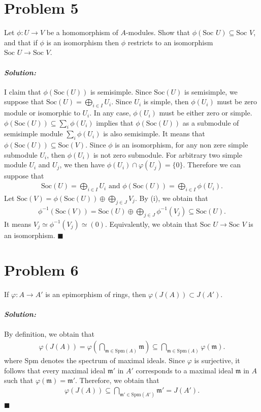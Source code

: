 \documentclass[12pt, a4paper]{article}
\theoremstyle{remark}
\newenvironment{solution}
  {\paragraph{\textit{Solution:}}\par\medskip}
  {\hfill$\blacksquare$\vspace{0.1cm}}
\begin{document}
\section*{Problem 5}
Let $\phi : U \to V$ be a homomorphism of $A$-modules. Show that $\phi(\text{Soc } U) \subseteq \text{Soc } V$, and that if $\phi$ is an isomorphism then $\phi$ restricts to an isomorphism $\text{Soc } U \to \text{Soc } V$.
\begin{solution}
    I claim that $\phi(\text{Soc}(U))$ is semisimple. Since $\text{Soc}(U)$ is semisimple, we suppose that $\text{Soc}(U)=\bigoplus_{i\in I} U_i$.
    Since $U_i$ is simple, then $\phi(U_i)$ must be zero module or isomorphic to $U_i$.
    In any case, $\phi(U_i)$ must be either zero or simple. $\phi(\text{Soc}(U))\subseteq \sum_{i} \phi(U_i)$ implies that $\phi(\text{Soc}(U))$ as a submodule of 
    semisimple module $ \sum_{i} \phi(U_i)$ is also semisimple. It means that $\phi(\text{Soc}(U)) \subseteq \text{Soc}(V)$.
    Since $\phi$ is an isomorphism, for any non zere simple submodule $U_i$, then $\phi(U_i)$ is not zero submodule. For arbitrary two simple module $U_i$ and $U_j$, we then have $\phi(U_i)\cap \varphi(U_j)=\{0\}$.
    Therefore we can suppose that 
    \begin{align*}
        \text{Soc}(U)= \bigoplus_{i\in I}U_i \text{ and }  \phi(\text{Soc}(U))= \bigoplus_{i\in I}\phi(U_i).
    \end{align*}
    Let $\text{Soc}(V) = \phi(\text{Soc}(U))\oplus \bigoplus_{j\in J}V_j$. By (i), we obtain that 
    \begin{align*}
        \phi^{-1}(\text{Soc}(V))=\text{Soc}(U)\oplus  \bigoplus_{j\in J}\phi^{-1}(V_j)\subseteq \text{Soc}(U).
    \end{align*}
    It means $V_j\simeq \phi^{-1}(V_j)\simeq (0)$. Equivalently, we obtain that $\text{Soc } U \to \text{Soc } V$ is an isomorphism.
\end{solution}


\section*{Problem 6}
If $\varphi : A \to A'$ is an epimorphism of rings, then $\varphi(J(A)) \subset J(A')$.
\begin{solution}
    By definition, we obtain that 
    \begin{align*}
        \varphi(J(A))=\varphi\left(\bigcap_{\mathfrak{m}\in \text{Spm}(A)}\mathfrak{m}\right)\subseteq  \bigcap_{\mathfrak{m}\in \text{Spm}(A)}\varphi(\mathfrak{m}).
    \end{align*}
    where Spm denotes the spectrum of maximal ideals.
    Since $\varphi$ is surjective, it follows that every maximal ideal $\mathfrak{m}'$ in $A'$ corresponds to a maximal ideal $\mathfrak{m}$ in $A$
    such that $\varphi(\mathfrak{m})=\mathfrak{m}'$. Therefore, we obtain that 
    \begin{align*}
        \varphi(J(A))\subseteq \bigcap_{\mathfrak{m}'\in \text{Spm}(A')}\mathfrak{m}' = J(A').
    \end{align*}
\end{solution}
\end{document}
